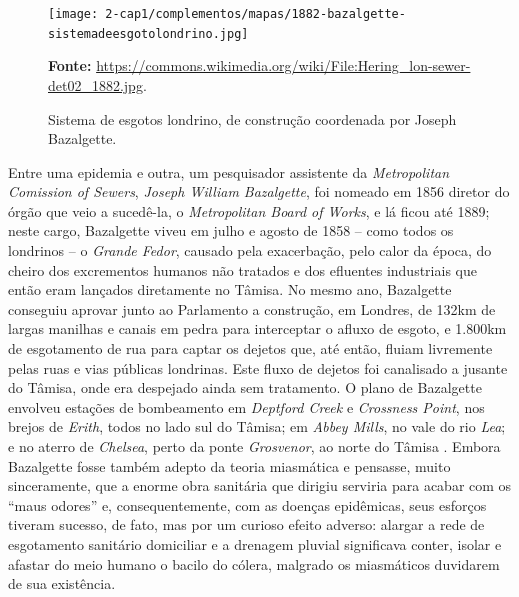 \begin{figure}
\centering
\caption{Sistema de esgotos londrino, de construção coordenada por Joseph Bazalgette.}
\texttt{[image: 2-cap1/complementos/mapas/1882-bazalgette-sistemadeesgotolondrino.jpg]}{\par \footnotesize \textbf{Fonte:} \url{https://commons.wikimedia.org/wiki/File:Hering_lon-sewer-det02_1882.jpg}. \par}
\label{fig:esgotoslondres1882} 
\end{figure}

Entre uma epidemia e outra, um pesquisador assistente da \textit{Metropolitan Comission of Sewers}, \textit{Joseph William Bazalgette}, foi nomeado em 1856 diretor do órgão que veio a sucedê-la, o \textit{Metropolitan Board of Works}, e lá ficou até 1889; neste cargo, Bazalgette viveu em julho e agosto de 1858 -- como todos os londrinos -- o \textit{Grande Fedor}, causado pela exacerbação, pelo calor da época, do cheiro dos excrementos humanos não tratados e dos efluentes industriais que então eram lançados diretamente no Tâmisa. No mesmo ano, Bazalgette conseguiu aprovar junto ao Parlamento a construção, em Londres, de 132km de largas manilhas e canais em pedra para interceptar o afluxo de esgoto, e 1.800km de esgotamento de rua para captar os dejetos que, até então, fluiam livremente pelas ruas e vias públicas londrinas. Este fluxo de dejetos foi canalisado a jusante do Tâmisa, onde era despejado ainda sem tratamento. O plano de Bazalgette envolveu estações de bombeamento em \textit{Deptford Creek} e \textit{Crossness Point}, nos brejos de \textit{Erith}, todos no lado sul do Tâmisa; em \textit{Abbey Mills}, no vale do rio \textit{Lea}; e no aterro de \textit{Chelsea}, perto da ponte \textit{Grosvenor}, ao norte do Tâmisa \cite{bazalgette_london_1865, bazalgette_metropolitan_1865}. Embora Bazalgette fosse também adepto da teoria miasmática e pensasse, muito sinceramente, que a enorme obra sanitária que dirigiu serviria para acabar com os ``maus odores'' e, consequentemente, com as doenças epidêmicas, seus esforços tiveram sucesso, de fato, mas por um curioso efeito adverso: alargar a rede de esgotamento sanitário domiciliar e a drenagem pluvial significava conter, isolar e afastar do meio humano o bacilo do cólera, malgrado os miasmáticos duvidarem de sua existência.

